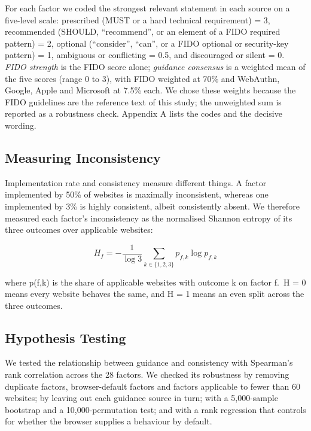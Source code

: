 \documentclass[letterpaper,twocolumn,10pt]{article}
\begin{document}
For each factor we coded the strongest relevant statement in each source on a five-level scale: prescribed (MUST or a hard technical requirement) = 3, recommended (SHOULD, ``recommend'', or an element of a FIDO required pattern) = 2, optional (``consider'', ``can'', or a FIDO optional or security-key pattern) = 1, ambiguous or conflicting = 0.5, and discouraged or silent = 0. \emph{FIDO strength} is the FIDO score alone; \emph{guidance consensus} is a weighted mean of the five scores (range 0 to 3), with FIDO weighted at 70\% and WebAuthn, Google, Apple and Microsoft at 7.5\% each. We chose these weights because the FIDO guidelines are the reference text of this study; the unweighted sum is reported as a robustness check. Appendix A lists the codes and the decisive wording.

\subsection{Measuring Inconsistency}

Implementation rate and consistency measure different things. A factor implemented by 50\% of websites is maximally inconsistent, whereas one implemented by 3\% is highly consistent, albeit consistently absent. We therefore measured each factor's inconsistency as the normalised Shannon entropy of its three outcomes over applicable websites:

\begin{equation}
H_f = -\frac{1}{\log 3} \sum_{k \in \{1,2,3\}} p_{f,k} \log p_{f,k}
\end{equation}

where p(f,k) is the share of applicable websites with outcome k on factor f.~H = 0 means every website behaves the same, and H = 1 means an even split across the three outcomes.

\subsection{Hypothesis Testing}

We tested the relationship between guidance and consistency with Spearman's rank correlation across the 28 factors. We checked its robustness by removing duplicate factors, browser-default factors and factors applicable to fewer than 60 websites; by leaving out each guidance source in turn; with a 5,000-sample bootstrap and a 10,000-permutation test; and with a rank regression that controls for whether the browser supplies a behaviour by default.
\end{document}
